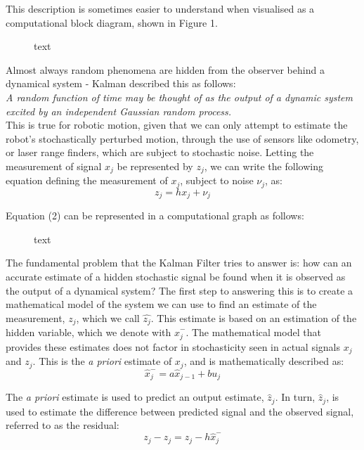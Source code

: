\documentclass[a4paper]{article}
\begin{document}
This description is sometimes easier to understand when visualised as a computational block diagram, shown in Figure 1.
\begin{figure}[h]
\centering

\caption{text}
\end{figure}

Almost always random phenomena are hidden from the observer behind a dynamical system - Kalman described this as follows:\\

\textit{A random function of time may be thought of as the output of a dynamic system excited by an independent Gaussian random process.} \cite{Kalman:1960}\\

This is true for robotic motion, given that we can only attempt to estimate the robot's stochastically perturbed motion, through the use of sensors like odometry, or laser range finders, which are subject to stochastic noise. Letting the measurement of signal $x_j$ be represented by $z_j$, we can write the following equation defining the measurement of $x_j$, subject to noise $\nu_j$, as:
\begin{equation}
z_j = h x_j + \nu_j
\end{equation} 

Equation (2) can be represented in a computational graph as follows:
\begin{figure}[h]
\centering

\caption{text}
\end{figure}

The fundamental problem that the Kalman Filter tries to answer is: how can an accurate estimate of a hidden stochastic signal be found when it is observed as the output of a dynamical system? The first step to answering this is to create a mathematical model of the system we can use to find an estimate of the measurement, $z_j$, which we call $\hat{z_j}$. This estimate is based on an estimation of the hidden variable, which we denote with $\hat{x}^-_j$. The mathematical model that provides these estimates does not factor in stochasticity seen in actual signals $x_j$ and $z_j$. This is the \textit{a priori} estimate of $x_j$, and is mathematically described as:
\begin{equation}
\hat{x}^-_j = a \hat{x}_{j-1} + b u_j
\end{equation}

The \textit{a priori} estimate is used to predict an output estimate,  $\hat{z}_j$. In turn, $\hat{z}_j$, is used to estimate the difference between predicted signal and the observed signal, referred to as the residual:
\begin{equation}
z_j - \hat{z}_j = z_j - h \hat{x}^-_j
\end{equation}
\end{document}
